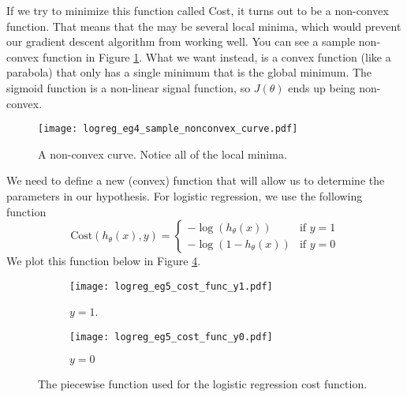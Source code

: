 If we try to minimize this function called Cost, it turns out to be a non-convex function. That means that the may be several local minima, which would prevent our gradient descent algorithm from working well. You can see a sample non-convex function in Figure \ref{logreg_eg4_sample_nonconvex_curve.pdf}. What we want instead, is a convex function (like a parabola) that only has a single minimum that is the global minimum. The sigmoid function is a non-linear signal function, so $J\left(\theta\right)$ ends up being non-convex. 
\begin{figure}[h] %
	\centering
	\graphicspath{{./Figures/}} %
	\texttt{[image: logreg\_eg4\_sample\_nonconvex\_curve.pdf]} 
	\caption[]{A non-convex curve. Notice all of the local minima.}
	\label{logreg_eg4_sample_nonconvex_curve.pdf}
\end{figure}

We need to define a new (convex) function that will allow us to determine the parameters in our hypothesis. For logistic regression, we use the following function
\begin{equation}
\text{Cost}\left(h_\theta\left(x\right), y\right) = \begin{cases} -\log\left(h_\theta\left(x\right)\right) & \text{if } y = 1 \\ -\log\left(1 - h_\theta\left(x\right)\right) &\text{if } y = 0 \end{cases}
\end{equation}
We plot this function below in Figure \ref{chaplogreg-sectcostfunct-plotcostfuncsample}. 

\begin{figure}[h]
	\centering
	\begin{subfigure}[t]{0.45\textwidth}
   		\centering
    		\graphicspath{{./Figures/}}
  		\texttt{[image: logreg\_eg5\_cost\_func\_y1.pdf]} 
   		\caption[]{$y=1$.}
   		\label{logreg_eg5_cost_func_y1.pdf}
	\end{subfigure}
	\begin{subfigure}[t]{0.45\textwidth}
   		\centering
    		\graphicspath{{./Figures/}}
   		\texttt{[image: logreg\_eg5\_cost\_func\_y0.pdf]} 
   		\caption[]{$y=0$}
   		\label{logreg_eg5_cost_func_y0.pdf}
	\end{subfigure}
	\caption[]{The piecewise function used for the logistic regression cost function. }
	\label{chaplogreg-sectcostfunct-plotcostfuncsample}
\end{figure}

